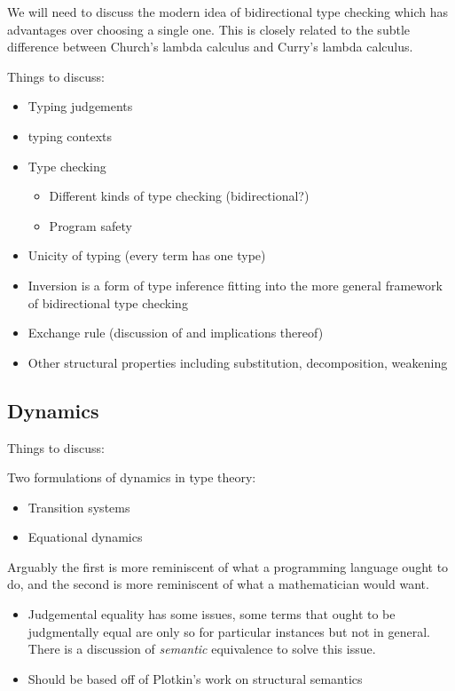 We will need to discuss the modern idea of bidirectional type checking which has advantages over choosing a single one. This is closely related to the subtle difference between Church's lambda calculus and Curry's lambda calculus.


Things to discuss:

\begin{itemize}
    \item Typing judgements
    \item typing contexts
    \item Type checking
    \begin{itemize}
        \item Different kinds of type checking (bidirectional?)
        \item Program safety
    \end{itemize}
    \item Unicity of typing (every term has one type)
    \item Inversion is a form of type inference fitting into the more general framework of bidirectional type checking
    \item Exchange rule (discussion of and implications thereof)
    \item Other structural properties including substitution, decomposition, weakening
\end{itemize}

\subsection{Dynamics}

Things to discuss:

\item Two formulations of dynamics in type theory:
\begin{itemize}
    \item Transition systems
    \item Equational dynamics
\end{itemize}

Arguably the first is more reminiscent of what a programming language ought to do, and the second is more reminiscent of what a mathematician would want.

\begin{itemize}
    \item Judgemental equality has some issues, some terms that ought to be judgmentally equal are only so for particular instances but not in general. There is a discussion of \emph{semantic} equivalence to solve this issue.
    \item Should be based off of Plotkin's work on structural semantics
\end{itemize}

